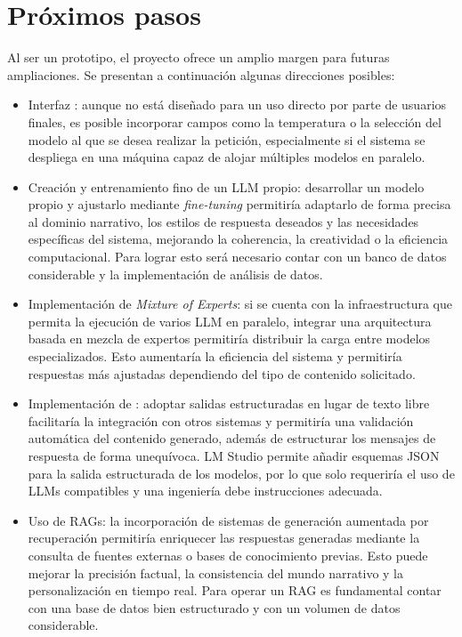 \section{Próximos pasos}
Al ser un prototipo, el proyecto ofrece un amplio margen para futuras ampliaciones.
Se presentan a continuación algunas direcciones posibles:

\begin{itemize}
\item Interfaz :
      aunque no está diseñado para un uso directo por parte de usuarios finales,
      es posible incorporar campos como la temperatura o la selección del modelo
      al que se desea realizar la petición, especialmente si el sistema se despliega
      en una máquina capaz de alojar múltiples modelos en paralelo.
\item Creación y entrenamiento fino de un LLM propio:
      desarrollar un modelo propio y ajustarlo mediante \textit{fine-tuning}
      permitiría adaptarlo de forma precisa al dominio narrativo,
      los estilos de respuesta deseados y las necesidades específicas del sistema,
      mejorando la coherencia, la creatividad o la eficiencia computacional.
      Para lograr esto será necesario contar con un banco de datos considerable y la
      implementación de análisis de datos.
\item Implementación de \textit{Mixture of Experts}:
      si se cuenta con la infraestructura que permita la ejecución de varios LLM en paralelo,
      integrar una arquitectura basada en mezcla de expertos permitiría distribuir
      la carga entre modelos especializados.
      Esto aumentaría la eficiencia del sistema y permitiría
      respuestas más ajustadas dependiendo del tipo de contenido solicitado.
\item Implementación de :
      adoptar salidas estructuradas en lugar de texto libre 
      facilitaría la integración con otros sistemas
      y permitiría una validación automática del contenido generado,
      además de estructurar los mensajes de respuesta de forma unequívoca.
      LM Studio permite añadir esquemas JSON para la salida estructurada de los modelos,
      por lo que solo requeriría el uso de LLMs compatibles y una ingeniería debe
      instrucciones adecuada.
\item Uso de RAGs:
      la incorporación de sistemas de generación aumentada por recuperación
      permitiría enriquecer las respuestas generadas mediante la consulta de
      fuentes externas o bases de conocimiento previas.
      Esto puede mejorar la precisión factual, la consistencia del mundo narrativo
      y la personalización en tiempo real.
      Para operar un RAG es fundamental contar con una base de datos bien estructurado
      y con un volumen de datos considerable.
\end{itemize}

